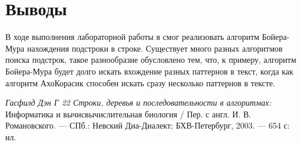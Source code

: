 \documentclass[pdf, unicode, 12pt, a4paper,oneside,fleqn]{article}
\begin{document}
\section{Выводы}

В ходе выполнения лабораторной работы я смог реализовать алгоритм Бойера-Мура
нахождения подстроки в строке. Существует много разных алгоритмов поиска подстрок, такое разнообразие обусловлено тем, что, к примеру, алгоритм Бойера-Мура
будет долго искать вхождение разных паттернов в текст, когда как алгоритм АхоКорасик способен искать сразу несколько паттернов в тексте.

\pagebreak
\begin{thebibliography}{99}
    {\itshape Гасфилд Дэн Г 22 Строки, деревья и последовательности в алгоритмах: } Информатика и вычисвычислительная биология / Пер. с англ. И. В. Романовского. — СПб.: Невский Диа-Диалект; БХВ-Петербург, 2003. — 654 с: ил.
    \end{thebibliography}
    \pagebreak
\end{document}
